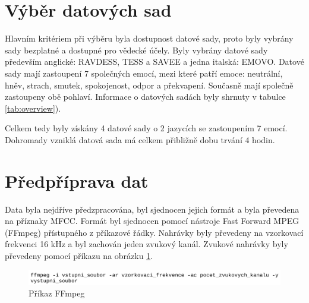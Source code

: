\documentclass[FM,BP]{tulthesis}
\begin{document}
\section{Výběr datových sad}
Hlavním kritériem při výběru byla dostupnost datové sady, proto byly vybrány sady bezplatné a dostupné pro vědecké účely. Byly vybrány datové sady především anglické: RAVDESS, TESS a SAVEE a jedna italská: EMOVO. Datové sady mají zastoupení 7 společných emocí, mezi které patří emoce: neutrální, hněv, strach, smutek, spokojenost, odpor a překvapení. Současně mají společně zastoupeny obě pohlaví. Informace o datových sadách byly shrnuty v tabulce \ref{tab:overview}).

\begin{table}[ht]
\centering
{}
\caption{Přehled vybraných datových sad}
\label{tab:overview}
\end{table}
\FloatBarrier

Celkem tedy byly získány 4 datové sady o 2 jazycích se zastoupením 7 emocí. Dohromady vzniklá datová sada má celkem přibližně dobu trvání 4 hodin.

\section{Předpříprava dat}
Data byla nejdříve předzpracována, byl sjednocen jejich formát a byla převedena na příznaky MFCC. Formát byl sjednocen pomocí nástroje Fast Forward MPEG (FFmpeg) přístupného z příkazové řádky. Nahrávky byly převedeny na vzorkovací frekvenci 16 kHz a byl zachován jeden zvukový kanál. Zvukové nahrávky byly převedeny pomocí příkazu na obrázku \ref{fig:ffmpeg}.

\begin{figure}[htbp]
\centerline{\includegraphics[width=\textwidth,height=\textheight,keepaspectratio]{ffmpeg_command.png}}
\caption{Příkaz FFmpeg}
\label{fig:ffmpeg}
\end{figure}
\FloatBarrier
\end{document}
